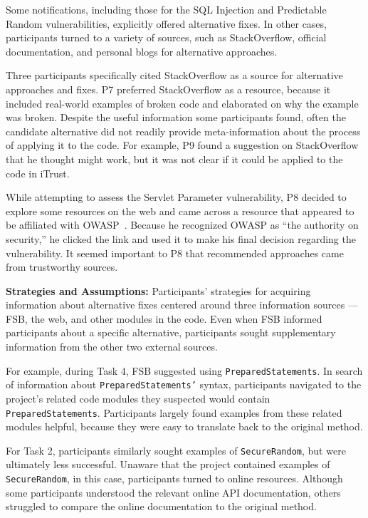 \documentclass[10pt,journal,compsoc]{IEEEtran}
\begin{document}
Some notifications, including those for the SQL Injection and Predictable Random vulnerabilities, explicitly offered alternative fixes. 
In other cases, participants turned to a variety of sources, such as StackOverflow, official documentation, and personal blogs for alternative approaches.
 
Three participants specifically cited StackOverflow as a source for alternative approaches and fixes.
P7 preferred StackOverflow as a resource, because it included real-world examples of broken code and elaborated on why the example was broken.
Despite the useful information some participants found, often the candidate alternative did not readily provide meta-information about the process of applying it to the code. 
For example, P9 found a suggestion on StackOverflow that he thought might work, but it was not clear if it could be applied to the code in iTrust.

While attempting to assess the Servlet Parameter vulnerability, P8 decided to explore some resources on the web and came across a resource that appeared to be affiliated with OWASP~\cite{OWASP}. 
Because he recognized OWASP as ``the authority on security,'' he clicked the link and used it to make his final decision regarding the vulnerability. 
It seemed important to P8 that recommended approaches came from trustworthy sources.


\textbf{Strategies and Assumptions:}
Participants' strategies for acquiring information about alternative fixes centered around three information sources --- FSB, the web, and other modules in the code. 
Even when FSB informed participants about a specific alternative, participants sought supplementary information from the other two external sources.

For example, during Task 4, FSB suggested using \texttt{PreparedStatements}. 
In search of information about \texttt{PreparedStatements'} syntax, participants navigated to the project's related code modules they suspected would contain \texttt{PreparedStatements}.
Participants largely found examples from these related modules helpful, because they were easy to translate back to the original method.

For Task 2, participants similarly sought examples of \texttt{SecureRandom}, but were ultimately less successful.
Unaware that the project contained examples of \texttt{SecureRandom}, in this case, participants turned to online resources.
Although some participants understood the relevant online API documentation, others struggled to compare the online documentation to the original method.
\end{document}
